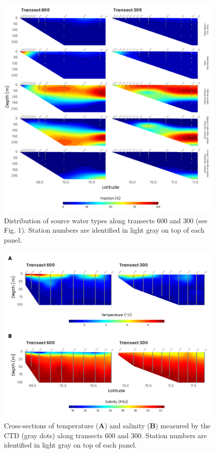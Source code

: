 \documentclass[essd, manuscript]{copernicus}
\begin{document}
\begin{figure}[H]
    \centering
    \includegraphics[scale = 1]{../../../graphs/fig03.pdf}
    \caption{Distribution of source water types along transects 600 and 300 (see Fig. 1). Station numbers are identified in light gray on top of each panel.}
\end{figure}

\clearpage

\begin{figure}[H]
    \centering
    \includegraphics[scale = 1]{../../../graphs/fig04.pdf}
    \caption{Cross-sections of temperature (\textbf{A}) and salinity (\textbf{B}) measured by the CTD (gray dots) along transects 600 and 300. Station numbers are identified in light gray on top of each panel.}
\end{figure}
\end{document}
